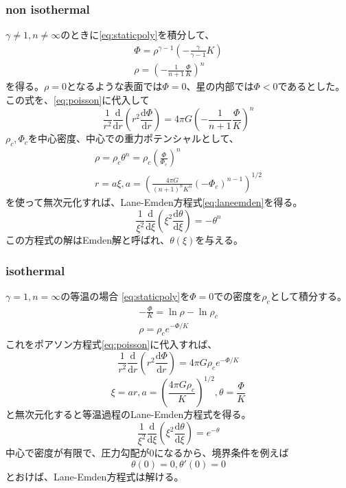 \documentclass{jsarticle}
\newcommand{\dder}[2][]{\frac{\mathrm{d}#1}{\mathrm{d}#2}}
\begin{document}
\subsubsection{non isothermal}
$\gamma \neq 1, n\neq \infty$のときに\eqref{eq:staticpoly}を積分して、
\begin{align}
    \Phi = \rho^{\gamma -1} (- \frac{\gamma}{\gamma -1}K)\\
    \rho = \left(- \frac{1}{n+1}\frac{\Phi}{K}\right)^n
\end{align}
を得る。$\rho =0$となるような表面では$\Phi=0$、星の内部では$\Phi < 0$であるとした。
この式を、\eqref{eq:poisson}に代入して
\begin{equation}
    \frac{1}{r^2}\dder[]{r}(r^2\dder[\Phi]{r}) = 4\pi G\left(- \frac{1}{n+1}\frac{\Phi}{K}\right)^n
\end{equation}
$\rho_c,\Phi_c$を中心密度、中心での重力ポテンシャルとして、
\begin{align}
    \rho = \rho_c \theta^n = \rho_c (\frac{\Phi}{\Phi_c})^n\\
r = a\xi, a = \left(\frac{4\pi G}{(n+1)^n K^n}(-\Phi_c)^{n-1}\right)^{1/2}
\end{align}
を使って無次元化すれば、Lane-Emden方程式\eqref{eq:laneemden}を得る。
\begin{equation}
    \frac{1}{\xi^2}\dder[]{\xi}\left(\xi^2\dder[\theta]{\xi}\right) = - \theta^n\label{eq:laneemden}
\end{equation}
この方程式の解はEmden解と呼ばれ、$\theta(\xi)$を与える。
\subsubsection{isothermal}
$\gamma=1,n=\infty$の等温の場合
\eqref{eq:staticpoly}を$\Phi=0$での密度を$\rho_c$として積分する。
\begin{align}
    - \frac{\Phi}{K} = \ln \rho - \ln \rho_c\\
    \rho = \rho_ce^{-\Phi/K}
\end{align}
これをポアソン方程式\eqref{eq:poisson}に代入すれば、
\begin{equation}
    \frac{1}{r^2}\dder[]{r}(r^2\dder[\Phi]{r}) = 4\pi G\rho_c e^{-\Phi/K}
\end{equation}
\begin{equation}
    \xi = ar, a = \left( \frac{4\pi G \rho_c}{K}\right)^{1/2}, \theta = \frac{\Phi}{K}
\end{equation}
と無次元化すると等温過程のLane-Emden方程式を得る。
\begin{equation}
    \frac{1}{\xi^2}\dder[]{\xi}\left(\xi^2\dder[\theta]{\xi}\right) = e^{-\theta}
\end{equation}
中心で密度が有限で、圧力勾配が$0$になるから、境界条件を例えば
\begin{equation}
    \theta(0) = 0,    \theta'(0) = 0
\end{equation}
とおけば、Lane-Emden方程式は解ける。
\end{document}
